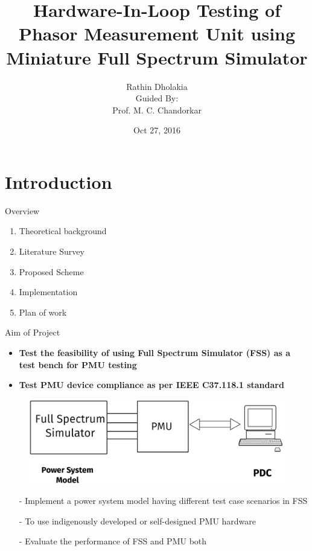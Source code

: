 \documentclass{beamer}
\title{ Hardware-In-Loop Testing of Phasor Measurement Unit using Miniature Full Spectrum Simulator}
\date{Oct 27, 2016}
\author{Rathin Dholakia \\Guided By:\\ Prof. M. C. Chandorkar}
\institute{MTP Stage - 1}
\begin{document}
  \maketitle
  \section{Introduction}


  \begin{frame}{Overview}
 	\begin{enumerate}
  	\item Theoretical background
  	\item Literature Survey
  	\item Proposed Scheme
  	\item Implementation
  	\item Plan of work
 	\end{enumerate}
   \end{frame}
 
 
 \begin{frame}{Aim of Project}
  \begin{itemize}
  \item \textbf{Test the feasibility of using Full Spectrum Simulator (FSS) as a test bench for PMU testing}
  \item \textbf{Test PMU device compliance as per IEEE C37.118.1 standard}
  \end{itemize}

 \begin{figure}
 \includegraphics*[scale=0.1]{Aim.png}
 \end{figure}

 \begin{itemize}
	 \item[-] Implement a power system model having different test case scenarios in FSS
  	\item[-] To use indigenously developed or self-designed PMU hardware
	 \item[-] Evaluate the performance of FSS and PMU both
 \end{itemize}
 

 \end{frame} 
 
\end{document}

